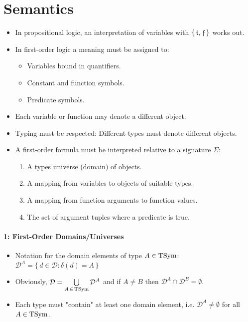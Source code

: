 	\section{Semantics}
		\begin{itemize}
			\item In propositional logic, an interpretation of variables with \( \{\, \mathfrak{t},\, \mathfrak{f} \,\} \) works out.
			\item In first-order logic a meaning must be assigned to:
				\begin{itemize}
					\item Variables bound in quantifiers.
					\item Constant and function symbols.
					\item Predicate symbols.
				\end{itemize}
			\item Each variable or function may denote a different object.
			\item Typing must be respected: Different types must denote different objects.
			\item A first-order formula must be interpreted relative to a signature \(\Sigma\):
				\begin{enumerate}
					\item A types universe (domain) of objects.
					\item A mapping from variables to objects of suitable types.
					\item A mapping from function arguments to function values.
					\item The set of argument tuples where a predicate is true.
				\end{enumerate}
		\end{itemize}
	
		\paragraph{1: First-Order Domains/Universes}
			
			\begin{itemize}
				\item Notation for the domain elements of type \( A \in \operatorname{TSym} \): \( \mathcal{D}^A = \{\, d \in \mathcal{D} : \delta(d) = A \,\} \)
				\item Obviously, \( \mathcal{D} = \bigcup\limits_{ A \,\in\, \operatorname{TSym} } \mathcal{D}^A \) and if \( A \neq B \) then \( \mathcal{D}^A \cap \mathcal{D}^B = \emptyset \).
				\item Each type must "contain" at least one domain element, i.e. \( \mathcal{D}^A \neq \emptyset \) for all \( A \in \operatorname{TSym} \).
			\end{itemize}
		
